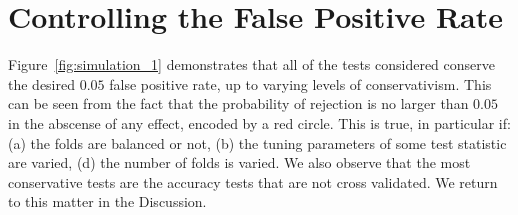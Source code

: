 \documentclass[12pt,a4paper]{article}
\begin{document}
\section{Controlling the False Positive Rate}
\label{sec:type_i}

Figure~\ref{fig:simulation_1} demonstrates that all of the tests considered conserve the desired $0.05$ false positive rate, up to varying levels of conservativism.
This can be seen from the fact that the probability of rejection is no larger than $0.05$ in the abscense of any effect, encoded by a red circle. 
This is true, in particular if:
(a) the folds are balanced or not,
(b) the tuning parameters of some test statistic are varied,
(d) the number of folds is varied.
We also observe that the most conservative tests are the accuracy tests that are not cross validated. 
We return to this matter in the Discussion.
\end{document}
